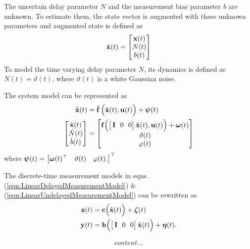 The uncertain delay parameter $N$ and the measurement bias parameter $b$ are unknown. To estimate them, the state vector is augmented with these unknown parameters and augmented state is defined as
\begin{align}
	\tilde{\mathbf{x}}(t) =
	\begin{bmatrix}
		\mathbf{x}(t) \\ N(t) \\ b(t)
	\end{bmatrix} 
\end{align}
To model the time varying delay parameter $N$, its dynamics is defined as $\dot{N}(t) = \vartheta(t)$, where $\vartheta(t)$ is a white Gaussian noise. 

The system model can be represented as
\begin{align}
	\dot{\tilde{\mathbf{x}}}(t) &= 
	\tilde{\mathbf{f}} \, \Big( \tilde{\mathbf{x}}(t), \mathbf{u}(t) \Big) + \boldsymbol{\psi}(t)\\
	\begin{bmatrix}
		\dot{\mathbf{x}}(t) \\ \dot{N}(t) \\ \dot{b}(t)
	\end{bmatrix} &= 
	\begin{bmatrix}
		\mathbf{f} \Big( \big[\, \mathbf{I} \ \ 0 \ \ 0 \big] \,\tilde{\mathbf{x}}(t), \mathbf{u}(t) \Big) + \boldsymbol{\omega}(t) \\ \vartheta(t) \\ \varphi(t)
	\end{bmatrix} \nonumber
\end{align}
where $\boldsymbol{\psi}(t) = \begin{bmatrix} \boldsymbol{\omega}(t)^\top & \vartheta(t) & \varphi(t). \end{bmatrix}^\top$

The discrete-time measurement models in eqns.(\ref{eqn:LinearDelayedMeasurementModel}) \& (\ref{eqn:LinearUndelayedMeasurementModel}) can be rewritten as
\begin{align} 
	\label{eqn:DelayedMeasurementModelAug}
	\mathbf{z}(t) &= \mathbf{c} \Big( \tilde{\mathbf{x}}(t) \Big) + \boldsymbol{\zeta}(t) \\
	\label{eqn:UndelayedMeasurementModelAug}
	\mathbf{y}(t) &= \mathbf{h} \Big( \big[\, \mathbf{I} \ \ 0 \ \ 0 \big] \,\tilde{\mathbf{x}}(t) \Big) + \boldsymbol{\eta}(t).
\end{align}

\begin{align}
	content...
\end{align}

